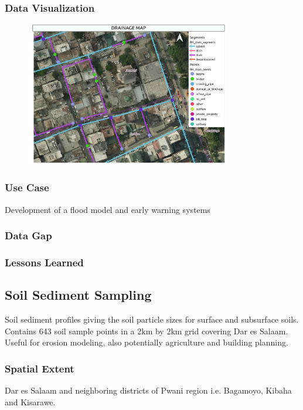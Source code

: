 \documentclass[a4paper,12pt,twoside]{article}
\begin{document}
\subsubsection{Data Visualization}
\begin{figure}[h]
  \centering
  \includegraphics[width=0.8\textwidth]{images/Drainage_Visualization.jpeg}
\end{figure}

\subsubsection{Use Case}
Development of a flood model and early warning systems

\subsubsection{Data Gap}

\subsubsection{Lessons Learned}

\newpage
\subsection{Soil Sediment Sampling}

Soil sediment profiles giving the soil particle sizes for surface and subsurface soils. Contains 643 soil sample points in a 2km by 2km grid covering Dar es Salaam.
Useful for erosion modeling, also potentially agriculture and building planning. 

\subsubsection{Spatial Extent}
Dar es Salaam and neighboring districts of Pwani region i.e. Bagamoyo, Kibaha and Kisarawe.
\end{document}
